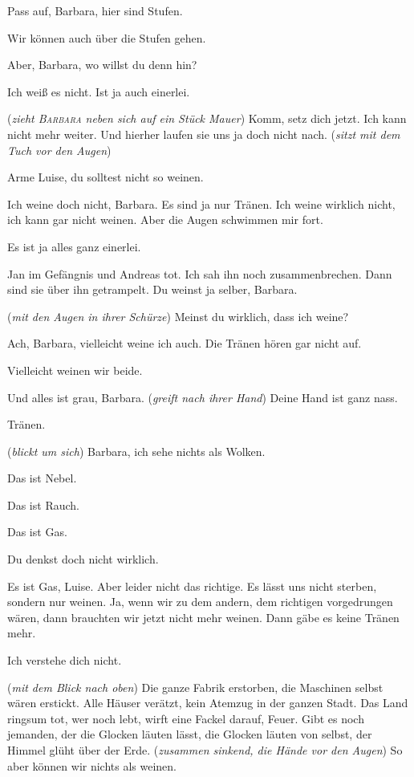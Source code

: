 \documentclass[
	final,
	a4paper,
	ngerman,
	mpinclude = true, %
	twoside = true,
	open = right,
	cleardoublepage = plain,
	DIV = 13,
	BCOR = 1cm,
	titlepage = firstiscover,
	]{scrbook}
\newcommand{\direction}[1]{(\textit{#1})}
\newcommand{\thecharacter}[1]{\textup{\textsc{#1}}\xspace}
\newcommand{\theBarbara}{\thecharacter{Barbara}}
\newcommand{\theLuise}{\thecharacter{Luise}}
\newcommand{\character}[1]{\item[#1]}
\newcommand{\Barbara}{\character{\theBarbara}}
\newcommand{\Luise}{\character{\theLuise}}
\begin{document}
\begin{play}

\Luise
Pass auf, Barbara, hier sind Stufen.

\Barbara
Wir können auch über die Stufen gehen.

\Luise
Aber, Barbara, wo willst du denn hin?

\Barbara
Ich weiß es nicht. Ist ja auch einerlei.

\Luise
\direction{zieht \theBarbara neben sich auf ein Stück Mauer} Komm, setz dich jetzt. Ich kann nicht mehr weiter. Und hierher laufen sie uns ja doch nicht nach. \direction{sitzt mit dem Tuch vor den Augen}

\Barbara
Arme Luise, du solltest nicht so weinen.

\Luise
Ich weine doch nicht, Barbara. Es sind ja nur Tränen. Ich weine wirklich nicht, ich kann gar nicht weinen. Aber die Augen schwimmen mir fort.

\Barbara
Es ist ja alles ganz einerlei.

\Luise
Jan im Gefängnis und Andreas tot. Ich sah ihn noch zusammenbrechen. Dann sind sie über ihn getrampelt. Du weinst ja selber, Barbara.

\Barbara
\direction{mit den Augen in ihrer Schürze} Meinst du wirklich, dass ich weine?

\Luise
Ach, Barbara, vielleicht weine ich auch. Die Tränen hören gar nicht auf.

\Barbara
Vielleicht weinen wir beide.

\Luise
Und alles ist grau, Barbara. \direction{greift nach ihrer Hand} Deine Hand ist ganz nass.

\Barbara
Tränen.

\Luise
\direction{blickt um sich} Barbara, ich sehe nichts als Wolken.

\Barbara
Das ist Nebel.

\Luise
Das ist Rauch.

\Barbara
Das ist Gas.

\Luise
Du denkst doch nicht wirklich.

\Barbara
Es ist Gas, Luise. Aber leider nicht das richtige. Es lässt uns nicht sterben, sondern nur weinen. Ja, wenn wir zu dem andern, dem richtigen vorgedrungen wären, dann brauchten wir jetzt nicht mehr weinen. Dann gäbe es keine Tränen mehr.

\Luise
Ich verstehe dich nicht.

\Barbara
\direction{mit dem Blick nach oben} Die ganze Fabrik erstorben, die Maschinen selbst wären erstickt. Alle Häuser verätzt, kein Atemzug in der ganzen Stadt. Das Land ringsum tot, wer noch lebt, wirft eine Fackel darauf, Feuer. Gibt es noch jemanden, der die Glocken läuten lässt, die Glocken läuten von selbst, der Himmel glüht über der Erde. \direction{zusammen sinkend, die Hände vor den Augen} So aber können wir nichts als weinen.


\end{play}
\end{document}
